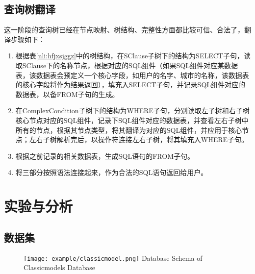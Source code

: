\subsection{查询树翻译}
\label{nli:cxsfy}
这一阶段的查询树已经在节点映射、树结构、完整性方面都比较可信、合法了，翻译步骤如下：
\begin{enumerate}
    \item 根据表\ref{nli:hfjxsjggz}中的树结构，在SClause子树下的结构为SELECT子句，读取SClause下的名称节点，根据对应的SQL组件（如果SQL组件对应某数据表，该数据表会预定义一个核心字段，如用户的名字、城市的名称，该数据表的核心字段将作为结果返回），填充入SELECT子句，并记录SQL组件对应的数据表，以备FROM子句的生成。
    \item 在ComplexCondition子树下的结构为WHERE子句，分别读取左子树和右子树核心节点对应的SQL组件，记录下SQL组件对应的数据表，并查看左右子树中所有的节点，根据其节点类型，将其翻译为对应的SQL组件，并应用于核心节点；左右子树解析完后，以操作符连接左右子树，将其填充入WHERE子句。
    \item 根据之前记录的相关数据表，生成SQL语句的FROM子句。
    \item 将三部分按照语法连接起来，作为合法的SQL语句返回给用户。
\end{enumerate}

\section{实验与分析}

\subsection{数据集}

\begin{figure}[!htp]
    \centering
    \texttt{[image: example/classicmodel.png]}
      {Database Schema of Classicmodels Database}
    \label{fig:NLIclassicmodel}
  \end{figure}

